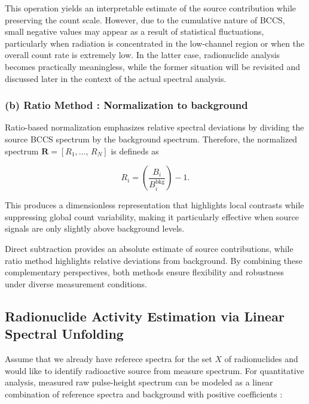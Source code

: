 \documentclass[10pt]{wlscirep}
\begin{document}
This operation yields an interpretable estimate of the source contribution while preserving the count scale. However, due to the cumulative nature of BCCS, small negative values may appear as a result of statistical fluctuations, particularly when radiation is concentrated in the low-channel region or when the overall count rate is extremely low. In the latter case, radionuclide analysis becomes practically meaningless, while the former situation will be revisited and discussed later in the context of the actual spectral analysis. 


\subsubsection*{(b) Ratio Method : Normalization to background} 

Ratio-based normalization emphasizes relative spectral deviations by dividing the source BCCS spectrum by the background spectrum. Therefore, the normalized spectrum $\mathbf{R}=[R_1,\ldots,\,R_N]$ is defineds as

\begin{equation}
R_i = \left(\dfrac{B_i}{B^{\textrm{bkg}}_i}\right) -1.
\end{equation}

This produces a dimensionless representation that highlights local contrasts while suppressing global count variability, making it particularly effective when source signals are only slightly above background levels.


Direct subtraction provides an absolute estimate of source contributions, while ratio method highlights relative deviations from background. By combining these complementary perspectives, both methods ensure flexibility and robustness under diverse measurement conditions.

\subsection*{Radionuclide Activity Estimation via Linear Spectral Unfolding}

Assume that we already have referece spectra for the set $X$ of radionuclides and would like to identify radioactive source from measure spectrum. For quantitative analysis, measured raw pulse-height spectrum can be modeled as a linear combination of reference spectra and background with positive coefficients :
\end{document}

